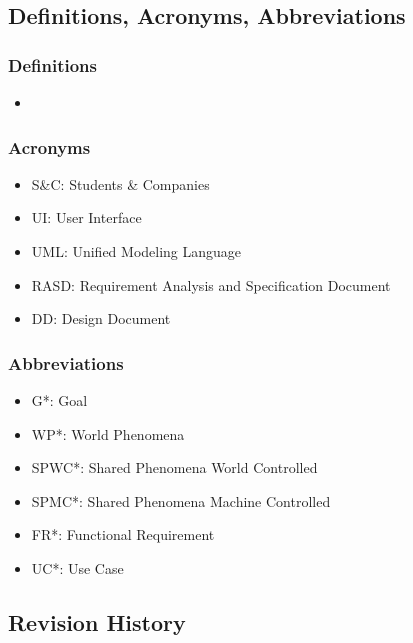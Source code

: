 
\subsection{Definitions, Acronyms, Abbreviations}

\subsubsection{Definitions}
\begin{itemize}
    \item 
\end{itemize}


\subsubsection{Acronyms}
\begin{itemize}
    \item {S\&C: Students \& Companies}
    \item {UI: User Interface}
    \item {UML: Unified Modeling Language}
    \item {RASD: Requirement Analysis and Specification Document}
    \item {DD: Design Document}
\end{itemize}


\subsubsection{Abbreviations}
\begin{itemize}
    \item {G*: Goal}
    \item {WP*: World Phenomena}
    \item {SPWC*: Shared Phenomena World Controlled}
    \item {SPMC*: Shared Phenomena Machine Controlled}
    \item {FR*: Functional Requirement}
    \item {UC*: Use Case}
\end{itemize}


\subsection{Revision History}

